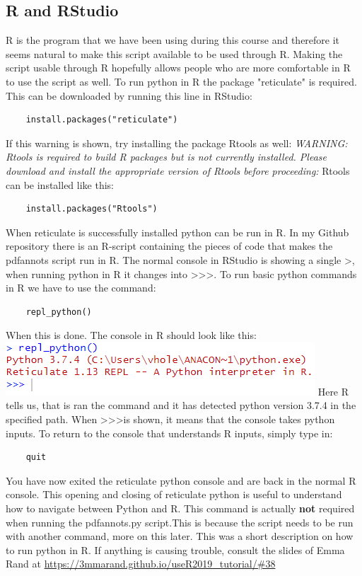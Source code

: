 \documentclass{article}
\begin{document}
\subsection{R and RStudio}
R is the program that we have been using during this course and therefore it seems natural to make this script available to be used through R. Making the script usable through R hopefully allows people who are more comfortable in R to use the script as well. To run python in R the package "reticulate" is required. This can be downloaded by running this line in RStudio:
\begin{verbatim}
    install.packages("reticulate")
\end{verbatim}
If this warning is shown, try installing the package Rtools as well: \textit{WARNING: Rtools is required to build R packages but is not currently installed. Please download and install the appropriate version of Rtools before proceeding:} Rtools can be installed like this:
\begin{verbatim}
    install.packages("Rtools")
\end{verbatim}
When reticulate is successfully installed python can be run in R. In my Github repository there is an R-script containing the pieces of code that makes the pdfannots script run in R. The normal console in RStudio is showing a single \textgreater, when running python in R it changes into \textgreater\textgreater\textgreater. To run basic python commands in R we have to use the command:
\begin{verbatim}
    repl_python()
\end{verbatim}
When this is done. The console in R should look like this: \newline
\includegraphics[scale=1]{repl_python.PNG} \newline
Here R tells us, that is ran the command and it has detected python version 3.7.4 in the specified path. When \textgreater\textgreater\textgreater is shown, it means that the console takes python inputs. To return to the console that understands R inputs, simply type in:
\begin{verbatim}
    quit
\end{verbatim}
You have now exited the reticulate python console and are back in the normal R console. This opening and closing of reticulate python is useful to understand how to navigate between Python and R. This command is actually \textbf{not} required when running the pdfannots.py script.This is because the script needs to be run with another command, more on this later.\newline
This was a short description on how to run python in R. If anything is causing trouble, consult the slides of Emma Rand at \url{https://3mmarand.github.io/useR2019_tutorial/#38}
\end{document}
